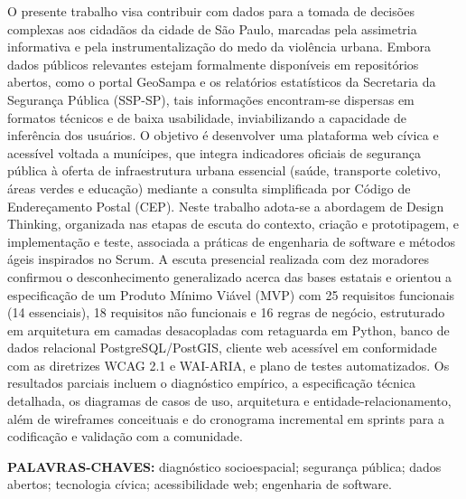 \documentclass[
    12pt,
    oneside,            %
    a4paper,
    brazilian
    ]{abntex2}
\begin{document}
{\linespread{1.0}\selectfont \noindent
O presente trabalho visa contribuir com dados para a tomada de decisões complexas aos cidadãos da cidade de São Paulo, marcadas pela assimetria informativa e pela instrumentalização do medo da violência urbana. Embora dados públicos relevantes estejam formalmente disponíveis em repositórios abertos, como o portal GeoSampa e os relatórios estatísticos da Secretaria da Segurança Pública (SSP-SP), tais informações encontram-se dispersas em formatos técnicos e de baixa usabilidade, inviabilizando a capacidade de inferência dos usuários. O objetivo é desenvolver uma plataforma web cívica e acessível voltada a munícipes, que integra indicadores oficiais de segurança pública à oferta de infraestrutura urbana essencial (saúde, transporte coletivo, áreas verdes e educação) mediante a consulta simplificada por Código de Endereçamento Postal (CEP). Neste trabalho adota-se a abordagem de Design Thinking, organizada nas etapas de escuta do contexto, criação e prototipagem, e implementação e teste, associada a práticas de engenharia de software e métodos ágeis inspirados no Scrum. A escuta presencial realizada com dez moradores confirmou o desconhecimento generalizado acerca das bases estatais e orientou a especificação de um Produto Mínimo Viável (MVP) com 25 requisitos funcionais (14 essenciais), 18 requisitos não funcionais e 16 regras de negócio, estruturado em arquitetura em camadas desacopladas com retaguarda em Python, banco de dados relacional PostgreSQL/PostGIS, cliente web acessível em conformidade com as diretrizes WCAG 2.1 e WAI-ARIA, e plano de testes automatizados. Os resultados parciais incluem o diagnóstico empírico, a especificação técnica detalhada, os diagramas de casos de uso, arquitetura e entidade-relacionamento, além de wireframes conceituais e do cronograma incremental em sprints para a codificação e validação com a comunidade.
	\par}


\vspace{2cm}
\noindent
\MakeUppercase{\textbf{Palavras-chaves:}} diagnóstico socioespacial; segurança pública; dados abertos; tecnologia cívica; acessibilidade web; engenharia de software.
\newpage
\listoffigures*
\cleardoublepage

\end{document}
